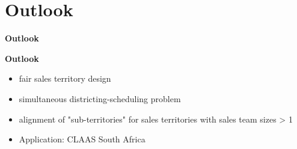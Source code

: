

\section{Outlook}
\begin{frame}
\begin{center}
{\LARGE \textbf{Outlook}}
\end{center}
\end{frame}

\begin{frame}{\textbf{Outlook}}
    \begin{itemize}[<+->]
     \item fair sales territory design
     \item simultaneous districting-scheduling problem
     \item alignment of "sub-territories" for sales territories with sales team sizes > 1
     \item Application: CLAAS South Africa
    \end{itemize}
\end{frame}


